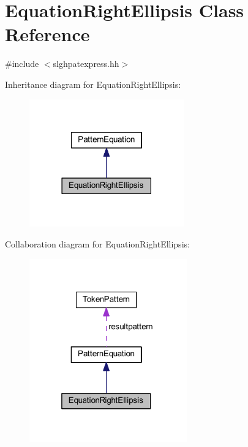 \hypertarget{class_equation_right_ellipsis}{}\section{Equation\+Right\+Ellipsis Class Reference}
\label{class_equation_right_ellipsis}


{\ttfamily \#include $<$slghpatexpress.\+hh$>$}



Inheritance diagram for Equation\+Right\+Ellipsis\+:
\nopagebreak
\begin{figure}[H]
\begin{center}
\leavevmode
\includegraphics[width=189pt]{class_equation_right_ellipsis__inherit__graph}
\end{center}
\end{figure}


Collaboration diagram for Equation\+Right\+Ellipsis\+:
\nopagebreak
\begin{figure}[H]
\begin{center}
\leavevmode
\includegraphics[width=193pt]{class_equation_right_ellipsis__coll__graph}
\end{center}
\end{figure}
